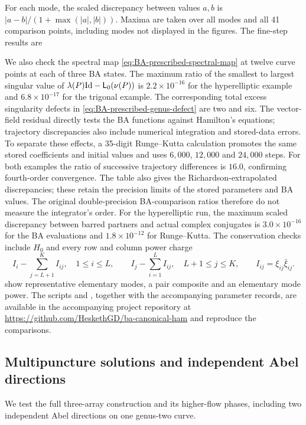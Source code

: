 For each mode, the scaled discrepancy between values $a,b$ is
$|a-b|/(1+\max(|a|,|b|))$. Maxima are taken over all modes and all
41 comparison points, including modes not displayed in the figures.
The fine-step results are

We also check the spectral map
\cref{eq:BA-prescribed-spectral-map} at twelve curve points at each
of three BA states. The maximum ratio of the smallest to largest
singular value of
$\lambda(P)\mathrm{Id}-\mathsf L_0(\nu(P))$ is
$2.2\times10^{-16}$ for the hyperelliptic example and
$6.8\times10^{-17}$ for the trigonal example. The corresponding
total excess singularity defects in
\cref{eq:BA-prescribed-genus-defect} are two and six.
The vector-field residual directly tests the BA functions against
Hamilton's equations; trajectory discrepancies also include numerical
integration and stored-data errors. To separate these effects, a
35-digit Runge--Kutta calculation promotes the same stored coefficients
and initial values and uses $6{,}000$, $12{,}000$ and $24{,}000$ steps.
For both examples the ratio of successive trajectory differences is
$16.0$, confirming fourth-order convergence. The table also gives the
Richardson-extrapolated discrepancies; these retain the precision limits
of the stored parameters and BA values. The original double-precision
BA-comparison ratios therefore do not measure the integrator's order.
For the hyperelliptic run, the maximum scaled discrepancy between
barred partners and actual complex conjugates is $3.0\times10^{-16}$
for the BA evaluations and $1.8\times10^{-12}$ for Runge--Kutta.
The conservation checks include $H_0$ and every row and column power charge
\[
 I_i-\sum_{j=L+1}^{K}I_{ij},\quad1\leq i\leq L,
 \qquad
 I_j-\sum_{i=1}^{L}I_{ij},\quad L+1\leq j\leq K,
 \qquad I_{ij}=\xi_{ij}\bar{\xi}_{ij}.
\]
 show representative
elementary modes, a pair composite and an elementary mode power.
The scripts  and
, together with the accompanying
parameter records, are available in the
accompanying project repository at
\url{https://github.com/HeskethGD/ba-canonical-ham}
and reproduce the comparisons.

\subsection{Multipuncture solutions and independent Abel directions}
\label{sec:numeric-multipuncture-flows}

We test the full three-array construction and its higher-flow phases,
including two independent Abel directions on one genus-two curve.

